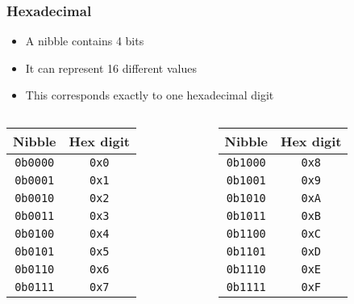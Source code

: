 \begin{frame}
  \frametitle{Hexadecimal}
  \begin{itemize}
    \item A nibble contains 4 bits
    \item It can represent 16 different values
    \item This corresponds exactly to one hexadecimal digit
  \end{itemize}
  \begin{columns}[t]
    \begin{column}{4cm}
      \begin{center}
        \begin{tabular}{cc}
          \toprule
          \textbf{Nibble} & \textbf{Hex digit} \\
          \midrule
          \texttt{0b0000} & \texttt{0x0} \\
          \texttt{0b0001} & \texttt{0x1} \\
          \texttt{0b0010} & \texttt{0x2} \\
          \texttt{0b0011} & \texttt{0x3} \\
          \texttt{0b0100} & \texttt{0x4} \\
          \texttt{0b0101} & \texttt{0x5} \\
          \texttt{0b0110} & \texttt{0x6} \\
          \texttt{0b0111} & \texttt{0x7} \\
          \bottomrule
        \end{tabular}
      \end{center}
    \end{column}
    \begin{column}{4cm}
      \begin{center}
        \begin{tabular}{cc}
          \toprule
          \textbf{Nibble} & \textbf{Hex digit} \\
          \midrule
          \texttt{0b1000} & \texttt{0x8} \\
          \texttt{0b1001} & \texttt{0x9} \\
          \texttt{0b1010} & \texttt{0xA} \\
          \texttt{0b1011} & \texttt{0xB} \\
          \texttt{0b1100} & \texttt{0xC} \\
          \texttt{0b1101} & \texttt{0xD} \\
          \texttt{0b1110} & \texttt{0xE} \\
          \texttt{0b1111} & \texttt{0xF} \\
          \bottomrule
        \end{tabular}
      \end{center}
    \end{column}
  \end{columns}
\end{frame}

